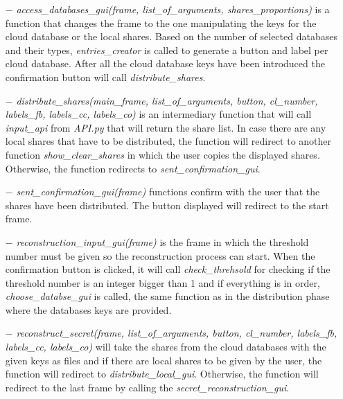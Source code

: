\documentclass[12pt, a4paper, oneside]{book}
\begin{document}
    \begin{itemize}
        \item[$-$] {\it access\_databases\_gui(frame, list\_of\_arguments, shares\_proportions)} is a function that changes the frame to the one manipulating the keys for the cloud database or the local shares. Based on the number of selected databases and their types, {\it entries\_creator} is called to generate a button and label per cloud database. After all the cloud database keys have been introduced the confirmation button will call {\it distribute\_shares}.
    \end{itemize}
    \begin{itemize}
        \item[$-$] {\it distribute\_shares(main\_frame, list\_of\_arguments, button, cl\_number, labels\_fb, labels\_cc, labels\_co)} is an intermediary function that will call {\it input\_api} from {\it API.py} that will return the share list. In case there are any local shares that have to be distributed, the function will redirect to another function {\it show\_clear\_shares} in which the user copies the displayed shares. Otherwise, the function redirects to {\it sent\_confirmation\_gui}.
    \end{itemize}
    \begin{itemize}
        \item[$-$] {\it sent\_confirmation\_gui(frame)}
        functions confirm with the user that the shares have been distributed. The button displayed will redirect to the start frame. 
    \end{itemize}
    \begin{itemize}
        \item[$-$] {\it reconstruction\_input\_gui(frame)} is the frame in which the threshold number must be given so the reconstruction process can start. When the confirmation button is clicked, it will call {\it check\_threhsold} for checking if the threshold number is an integer bigger than 1 and if everything is in order, {\it choose\_databse\_gui} is called, the same function as in the distribution phase where the databases keys are provided.
    \end{itemize}
    \begin{itemize}
        \item[$-$] {\it reconstruct\_secret(frame, list\_of\_arguments, button, cl\_number, labels\_fb, labels\_cc, labels\_co)} will take the shares from the cloud databases with the given keys as files and if there are local shares to be given by the user, the function will redirect to {\it distribute\_local\_gui}. Otherwise, the function will redirect to the last frame by calling the {\it secret\_reconstruction\_gui}.
    \end{itemize}
\end{document}
